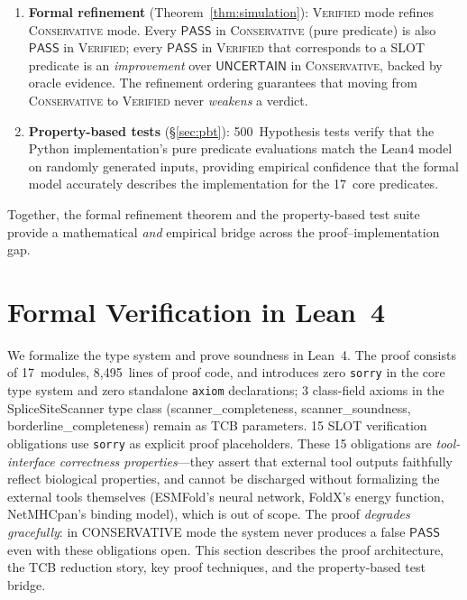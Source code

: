 \documentclass[acmsmall,review,anonymous]{acmart}
\newcommand{\PASS}{\ensuremath{\mathsf{PASS}}\xspace}
\newcommand{\UNCERTAIN}{\ensuremath{\mathsf{UNCERTAIN}}\xspace}
\newcommand{\CONSERVATIVE}{\textsc{Conservative}\xspace}
\newcommand{\VERIFIED}{\textsc{Verified}\xspace}
\begin{document}
\begin{enumerate}[leftmargin=*,itemsep=1pt,topsep=2pt]
\item \textbf{Formal refinement} (Theorem~\ref{thm:simulation}):
  \VERIFIED{} mode refines \CONSERVATIVE{} mode.
  Every \PASS{} in \CONSERVATIVE{} (pure predicate) is also \PASS{}
  in \VERIFIED{}; every \PASS{} in \VERIFIED{} that corresponds to a
  SLOT predicate is an \emph{improvement} over \UNCERTAIN{} in
  \CONSERVATIVE{}, backed by oracle evidence.
  The refinement ordering guarantees that moving from
  \CONSERVATIVE{} to \VERIFIED{} never \emph{weakens} a verdict.

\item \textbf{Property-based tests} (\S\ref{sec:pbt}):
  500~Hypothesis tests verify that the Python implementation's pure
  predicate evaluations match the Lean4 model on randomly generated
  inputs, providing empirical confidence that the formal model
  accurately describes the implementation for the 17~core predicates.
\end{enumerate}

Together, the formal refinement theorem and the property-based test
suite provide a mathematical \emph{and} empirical bridge across the
proof--implementation gap.

\section{Formal Verification in Lean~4}\label{sec:proof}

We formalize the type system and prove soundness in Lean~4.
The proof consists of 17~modules, 8{,}495~lines of proof code, and
introduces zero \texttt{sorry} in the core type system and zero standalone
\texttt{axiom} declarations; 3 class-field axioms in the SpliceSiteScanner
type class (scanner\_completeness, scanner\_soundness, borderline\_completeness)
remain as TCB parameters.
15 SLOT verification obligations use \texttt{sorry} as explicit proof placeholders.
These 15 obligations are \emph{tool-interface correctness properties}---they
assert that external tool outputs faithfully reflect biological properties,
and cannot be discharged without formalizing the external tools themselves
(ESMFold's neural network, FoldX's energy function, NetMHCpan's binding
model), which is out of scope. The proof \emph{degrades gracefully}: in
CONSERVATIVE mode the system never produces a false \PASS{} even with these
obligations open.
This section describes the proof architecture, the TCB reduction story,
key proof techniques, and the property-based test bridge.
\end{document}
